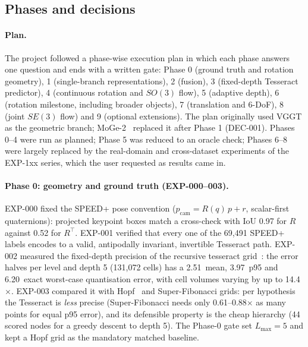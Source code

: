 \subsection{Phases and decisions}\label{app:log_phases}

\paragraph{Plan.}
The project followed a phase-wise execution plan in which each phase answers one question and ends with a written gate: Phase 0 (ground truth and rotation geometry), 1 (single-branch representations), 2 (fusion), 3 (fixed-depth Tesseract predictor), 4 (continuous rotation and $SO(3)$ flow), 5 (adaptive depth), 6 (rotation milestone, including broader objects), 7 (translation and 6-DoF), 8 (joint $SE(3)$ flow) and 9 (optional extensions). The plan originally used VGGT as the geometric branch; MoGe-2~\cite{wang2025moge2} replaced it after Phase 1 (DEC-001). Phases 0--4 were run as planned; Phase 5 was reduced to an oracle check; Phases 6--8 were largely replaced by the real-domain and cross-dataset experiments of the EXP-1xx series, which the user requested as results came in.

\paragraph{Phase 0: geometry and ground truth (EXP-000--003).}
EXP-000 fixed the SPEED+ pose convention ($p_\text{cam} = R(q)\,p + r$, scalar-first quaternions): projected keypoint boxes match a cross-check with IoU 0.97 for $R$ against 0.52 for $R^\top$. EXP-001 verified that every one of the 69,491 SPEED+ labels encodes to a valid, antipodally invariant, invertible Tesseract path. EXP-002 measured the fixed-depth precision of the recursive tesseract grid~\cite{kurz2017tesseract}: the error halves per level and depth 5 (131,072 cells) has a 2.51\appDdeg\ mean, 3.97\appDdeg\ p95 and 6.20\appDdeg\ exact worst-case quantisation error, with cell volumes varying by up to 14.4$\times$. EXP-003 compared it with Hopf~\cite{yershova2010hopf} and Super-Fibonacci grids: per hypothesis the Tesseract is \emph{less} precise (Super-Fibonacci needs only 0.61--0.88$\times$ as many points for equal p95 error), and its defensible property is the cheap hierarchy (44 scored nodes for a greedy descent to depth 5). The Phase-0 gate set $L_\text{max}=5$ and kept a Hopf grid as the mandatory matched baseline.

